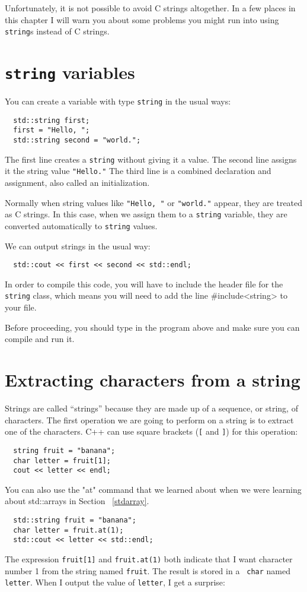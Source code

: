 Unfortunately, it is not possible to avoid C strings altogether.
In a few places in this chapter I will warn you about some problems
you might run into using {\tt string}s instead of C strings.

\section{{\tt string} variables}

You can create a variable with type {\tt string} in the usual
ways:

\begin{verbatim}
  std::string first;
  first = "Hello, ";
  std::string second = "world.";
\end{verbatim}
%
The first line creates a {\tt string} without giving it a value.
The second line assigns it the string value {\tt "Hello."}
The third line is a combined declaration and assignment, also
called an initialization.

Normally when string values like {\tt "Hello, "} or {\tt "world."}
appear, they are treated as C strings.  In this case, when we assign
them to a {\tt string} variable, they are converted automatically
to {\tt string} values.

We can output strings in the usual way:

\begin{verbatim}
  std::cout << first << second << std::endl;
\end{verbatim}
%

In order to compile this code, you will have to include the
header file for the {\tt string} class, which means you will need to
add the line \#include<string> to your file.  

Before proceeding, you should type in the program above and make
sure you can compile and run it.

\section{Extracting characters from a string}

Strings are called ``strings'' because they are made up of a sequence,
or string, of characters.  The first operation we are going to
perform on a string is to extract one of the characters.  C++
can use square brackets ({\tt [} and {\tt ]}) for this operation:

\begin{verbatim}
  string fruit = "banana";
  char letter = fruit[1];
  cout << letter << endl;
\end{verbatim}
%
You can also use the "at" command that we learned about when we were 
learning about std::arrays in Section ~\ref{stdarray}.
\begin{verbatim}
  std::string fruit = "banana";
  char letter = fruit.at(1);
  std::cout << letter << std::endl;
\end{verbatim}
The expression {\tt fruit[1]} and {\tt fruit.at(1)} both indicate that I want character number 1
from the string named {\tt fruit}.  The result is stored in a {\tt
char} named {\tt letter}.  When I output the value of {\tt letter}, I
get a surprise:

